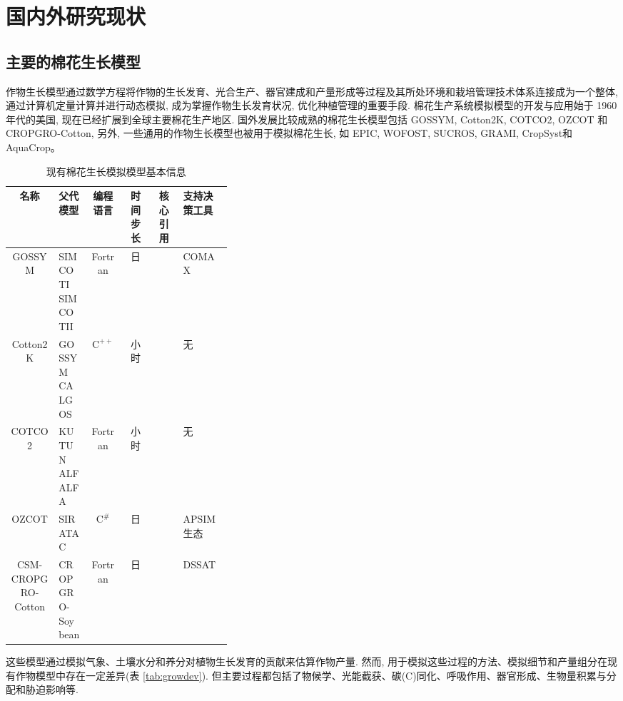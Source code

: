 \documentclass[a4paper,zihao=5]{ctexbook}
\begin{document}
\section{国内外研究现状}
\subsection{主要的棉花生长模型}
作物生长模型通过数学方程将作物的生长发育、光合生产、器官建成和产量形成等过程及其所处环境和栽培管理技术体系连接成为一个整体,
通过计算机定量计算并进行动态模拟, 成为掌握作物生长发育状况, 优化种植管理的重要手段.
棉花生产系统模拟模型的开发与应用始于 1960 年代的美国, 现在已经扩展到全球主要棉花生产地区.
国外发展比较成熟的棉花生长模型包括 GOSSYM\cite{baker1976}, Cotton2K\cite{cotton2kv4}, COTCO2\cite{wall1994}, OZCOT\cite{hearn1994} 和 CROPGRO-Cotton\cite{jones2003},
另外, 一些通用的作物生长模型也被用于模拟棉花生长, 如 EPIC\cite{williams1989}, WOFOST\cite{WOFOST}, SUCROS\cite{vanittersum2003}, GRAMI\cite{ko2005}, CropSyst\cite{sommer2008}和 AquaCrop\cite{steduto2009}。

\begin{table}
    \caption{现有棉花生长模拟模型基本信息}
    \small
    \centering
    \begin{tabular}{cp{0.14\linewidth}cccp{0.22\linewidth}}
        \toprule
        名称               & 父代模型         & 编程语言          & 时间步长 & 核心引用          & 支持决策工具 \\
        \midrule
        GOSSYM             & SIMCOTI SIMCOTII & Fortran           & 日       &                   & COMAX        \\
        Cotton2K           & GOSSYM CALGOS    & $\mathrm{C^{++}}$ & 小时     &                   & 无           \\
        COTCO2             & KUTUN ALFALFA    & Fortran           & 小时     &                   & 无           \\
        OZCOT              & SIRATAC          & $\mathrm{C^{\#}}$ & 日       & \citet{hearn1994} & APSIM 生态   \\
        CSM-CROPGRO-Cotton & CROPGRO-Soybean  & Fortran           & 日       &                   & DSSAT        \\
        \bottomrule
    \end{tabular}
\end{table}

这些模型通过模拟气象、土壤水分和养分对植物生长发育的贡献来估算作物产量.
然而, 用于模拟这些过程的方法、模拟细节和产量组分在现有作物模型中存在一定差异(表 \ref{tab:growdev})\cite{thorp2014}.
但主要过程都包括了物候学、光能截获、碳(C)同化、呼吸作用、器官形成、生物量积累与分配和胁迫影响等.
\end{document}
